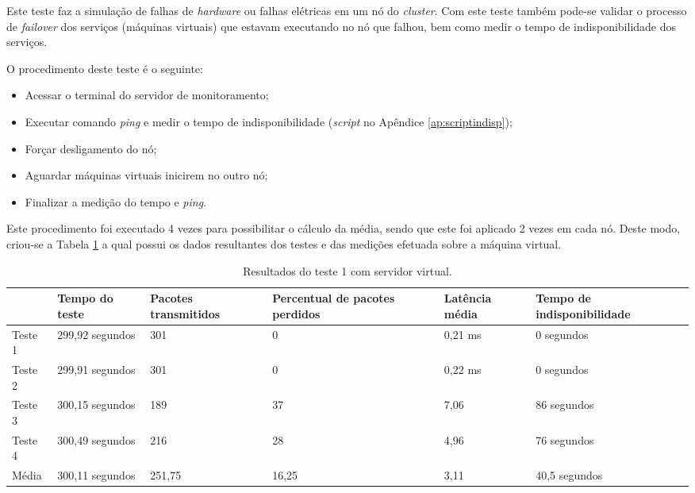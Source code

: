 Este teste faz a simulação de falhas de \textit{hardware} ou falhas elétricas em um nó do \textit{cluster}. Com este teste também pode-se 
validar o processo de \textit{failover} dos serviços (máquinas virtuais) que estavam executando no nó que falhou, bem como medir o tempo de 
indisponibilidade dos serviços.

O procedimento deste teste é o seguinte:
\begin{itemize}
 \item Acessar o terminal do servidor de monitoramento;
 \item Executar comando \textit{ping} e medir o tempo de indisponibilidade (\textit{script} no Apêndice \ref{ap:scriptindisp});
 \item Forçar desligamento do nó;
 \item Aguardar máquinas virtuais inicirem no outro nó;
 \item Finalizar a medição do tempo e \textit{ping}.
\end{itemize}

Este procedimento foi executado 4 vezes para possibilitar o cálculo da média, sendo que este foi aplicado 2 vezes em cada nó. Deste modo, 
criou-se a Tabela \ref{tab:teste1resultadosvirt} a qual possui os dados resultantes dos testes e das medições efetuada sobre a máquina virtual.

\begin{table}[h!]
\caption{Resultados do teste 1 com servidor virtual.}
\label{tab:teste1resultadosvirt}
\begin{center}
\begin{tabular}{|l|p{2.3cm}|p{2.2cm}|p{2.5cm}|p{2cm}|p{2.7cm}|}\hline
 & \textbf{Tempo do teste} & \textbf{Pacotes transmitidos} & \textbf{Percentual de pacotes perdidos} & \textbf{Latência média} & \textbf{Tempo de indisponibilidade} \\\hline
Teste 1 & 299,92 segundos & 301 & 0 & 0,21 ms & 0 segundos \\\hline
Teste 2 & 299,91 segundos & 301 & 0 & 0,22 ms & 0 segundos \\\hline
Teste 3 & 300,15 segundos & 189 & 37 & 7,06 & 86 segundos \\\hline
Teste 4 & 300,49 segundos & 216 & 28 & 4,96 & 76 segundos \\\hline
Média & 300,11 segundos & 251,75 & 16,25 & 3,11 & 40,5 segundos \\\hline
\end{tabular}
\end{center}
\end{table}

